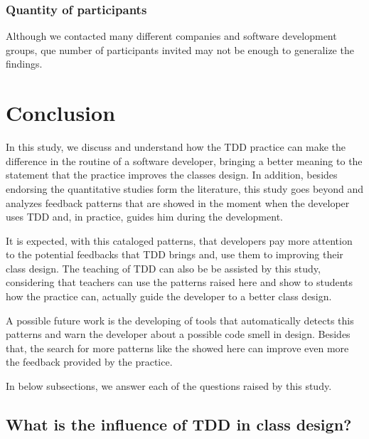 \documentclass[conference]{IEEEtran}
\begin{document}
\begin{framed}
\begin{framed}
\subsubsection{Quantity of participants}

Although we contacted many different companies and software development groups,
que number of participants invited may not be enough to generalize the findings.

\section{Conclusion}


In this study, we discuss and understand how the TDD practice can make the
difference in the routine of a software developer, bringing a better meaning
to the statement that the practice improves the classes design.
In addition, besides endorsing the quantitative studies form the literature, this study
goes beyond and analyzes feedback patterns that are showed in the moment when
the developer uses TDD and, in practice, guides him during the development.

It is expected, with this cataloged patterns, that developers pay more attention
to the potential feedbacks that TDD brings and, use them to improving their class
design. The teaching of TDD can also be be assisted by this study, considering
that teachers can use the patterns raised here and show to students
how the practice can, actually guide the developer to a better class design.


A possible future work is the developing of tools that automatically detects this patterns
and warn the developer about a possible code smell in design. Besides that,
the search for more patterns like the showed here can improve even more the feedback
provided by the practice.

In below subsections, we answer each of the questions raised by this study.

\subsection{What is the influence of TDD in class design?}


\end{framed}
\end{framed}
\end{document}
